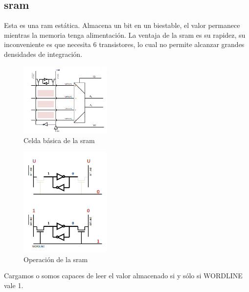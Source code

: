\subsection{\gls{sram}}
Esta es una \gls{ram} estática. Almacena un bit en un biestable, el valor permanece mientras la memoria tenga alimentación. La ventaja de la \gls{sram} es su rapidez, su inconveniente es que necesita 6 transistores, lo cual no permite alcanzar grandes densidades de integración.
\begin{multicols}{2}
	\begin{figure}[H]
		\centering
		\includegraphics[width=0.4\textwidth]{images/Tema_5/Celda_Basica_Ram.PNG}
		\caption{Celda básica de la \gls{sram}}
	\end{figure}
	\vfill
	\null
	\begin{figure}[H]
		\centering
		\includegraphics[width=0.4\textwidth]{images/Tema_5/Operacion_SRAM.PNG}
		\caption{Operación de la \gls{sram}}
	\end{figure}
	Cargamos o somos capaces de leer el valor almacenado si y sólo si WORDLINE vale 1.
\end{multicols}

